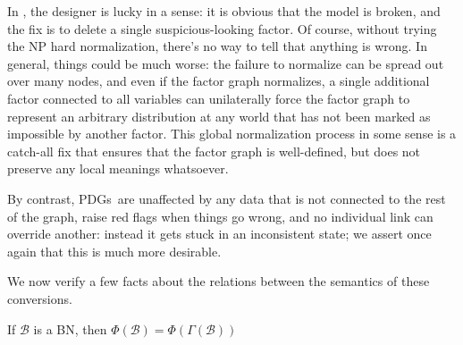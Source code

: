 \documentclass{article}
\newcommand{\bmu}{\boldsymbol{\mu}}
\newcommand{\Ed}{\mathcal E}
\newcommand{\MN}{PDG}
\newcommand{\MNs}{\MN s}
\numberwithin{equation}{section}
\begin{document}
	In , the designer is lucky in a sense: it is obvious that the model is broken, and the fix is to delete a single suspicious-looking factor. Of course, without trying the NP hard normalization, there's no way to tell that anything is wrong. In general, things could be much worse: the failure to normalize can be spread out over many nodes, and even if the factor graph normalizes, a single additional factor connected to all variables can unilaterally force the factor graph to represent an arbitrary distribution at any world that has not been marked as impossible by another factor. This global normalization process in some sense is a catch-all fix that ensures that the factor graph is well-defined, but does not preserve any local meanings whatsoever.
	
	
	By contrast, \MNs\ are unaffected by any data that is not connected  to the rest of the graph, raise red flags when things go wrong, and no individual link can override another: instead it gets stuck in an inconsistent state; we assert once again that this is much more desirable.
	
	
	

	
	We now verify a few facts about the relations between the semantics of these conversions.
	
	
	\begin{prop} \label{prop:}
		If $\mathcal B$ is a BN, then $\Phi(\mathcal B) = \Phi(\Gamma(\mathcal B))$
	\end{prop}
	
\end{document}
